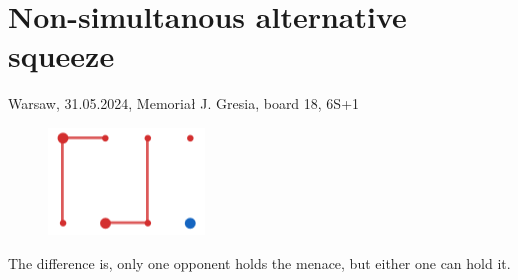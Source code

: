 \documentclass[14pt, a4paper]{extreport}
\begin{document}
\vspace{-3cm}
\hspace{3.5cm}\hspace{6cm}

\vspace{-0.2cm}
\hspace{3.5cm}\hspace{6cm}

\newpage
\section*{Non-simultanous alternative squeeze}
Warsaw, 31.05.2024, Memoriał J. Gresia, board 18, 6\ntx{}S+1

\handdiagramv
        {}
        {}
        {}
        {}
        {}

\vspace{0.3cm}

\hspace{5.8cm}\hspace{0.4cm}\hspace{0.4cm}\hspace{0.4cm}
\vspace{-0.4cm}
\begin{figure}[H]
    \centering
    \includegraphics[scale=0.7]{./squeezes/nonsim-double.png}
\end{figure}
\vspace{-0.9cm}
\hspace{5.8cm}\hspace{0.4cm}\hspace{0.4cm}\hspace{0.4cm}

\vspace{-3cm}
\hspace{3.5cm}\hspace{6cm}

\vspace{-0.2cm}
\hspace{3.5cm}\hspace{6cm}

\vspace{2cm}
The difference is, only one opponent holds the \spades menace, but either one can hold it.
\end{document}
